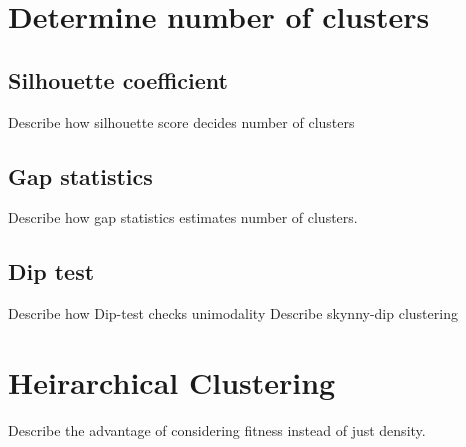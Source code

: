 \section{Determine number of clusters}
\subsection{Silhouette coefficient}
Describe how silhouette score decides number of clusters 
\subsection{Gap statistics}
Describe how gap statistics estimates number of clusters.
\subsection{Dip test}
Describe how Dip-test checks unimodality
Describe skynny-dip clustering

\section{Heirarchical Clustering}
Describe the advantage of considering fitness instead of just density.


